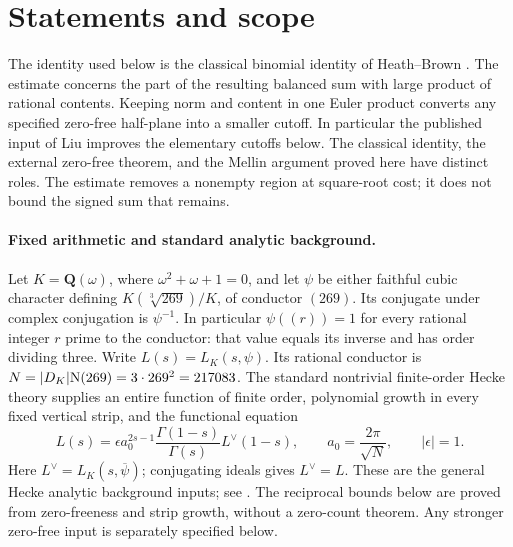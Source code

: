 \section{Statements and scope}

The identity used below is the classical binomial identity of
Heath--Brown \cite[p.~1367, Lemma~1, equations~(6)--(7)]{JCTHeathBrown}.
The estimate concerns the part of the resulting balanced sum with
large product of rational contents. Keeping norm and content in one
Euler product converts any specified zero-free half-plane into a
smaller cutoff. In particular the published input of
Liu \cite[Theorems~1.2 and~8.29]{JCTLiu} improves the elementary
cutoffs below. The classical identity, the external zero-free theorem,
and the Mellin argument proved here have distinct roles.
The estimate removes a nonempty region at square-root cost; it does
not bound the signed sum that remains.

\paragraph{Fixed arithmetic and standard analytic background.}
Let \(K=\mathbf Q(\omega)\), where \(\omega^2+\omega+1=0\), and
let \(\psi\) be either faithful cubic character defining
\(K(\sqrt[3]{269})/K\), of conductor \((269)\).
Its conjugate under complex conjugation is \(\psi^{-1}\).
In particular \(\psi((r))=1\) for every rational integer
\(r\) prime to the conductor: that value equals its inverse and
has order dividing three.
Write \(L(s)=L_K(s,\psi)\).  Its rational conductor is
\(N=|D_K|\mathrm N(269)=3\cdot269^2=217083\).
The standard nontrivial finite-order Hecke theory supplies an
entire function of finite order, polynomial growth in every fixed
vertical strip, and the functional equation
\begin{equation}
 L(s)=\epsilon a_0^{2s-1}
       \frac{\Gamma(1-s)}{\Gamma(s)}L^\vee(1-s),
 \qquad a_0=\frac{2\pi}{\sqrt N},\qquad |\epsilon|=1.
 \label{jct:fe}
\end{equation}
Here \(L^\vee=L_K(s,\overline\psi)\); conjugating ideals gives
\(L^\vee=L\).  These are the general Hecke analytic background inputs; see
\cite[\S2.1]{JCTZaman}. The reciprocal bounds below are proved
from zero-freeness and strip growth, without a zero-count theorem.
Any stronger zero-free input is separately specified below.

